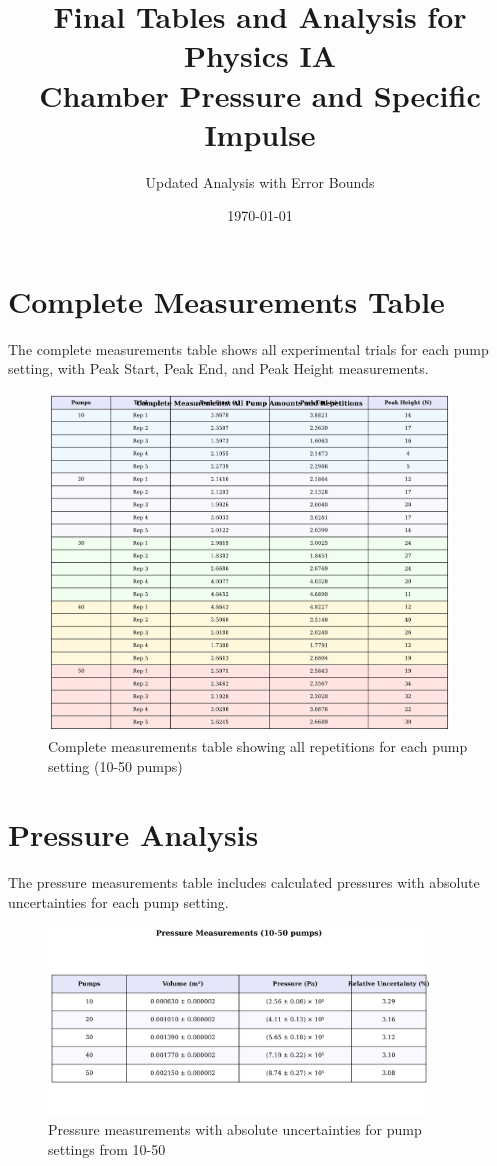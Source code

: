\documentclass[12pt,a4paper]{article}
\title{\textbf{Final Tables and Analysis for Physics IA\\Chamber Pressure and Specific Impulse}}
\author{Updated Analysis with Error Bounds}
\date{\today}
\begin{document}
\maketitle

\section{Complete Measurements Table}

The complete measurements table shows all experimental trials for each pump setting, with Peak Start, Peak End, and Peak Height measurements.

\begin{figure}[H]
\centering
\includegraphics[width=0.95\textwidth]{complete_measurements_table.png}
\caption{Complete measurements table showing all repetitions for each pump setting (10-50 pumps)}
\label{fig:complete_measurements}
\end{figure}

\section{Pressure Analysis}

The pressure measurements table includes calculated pressures with absolute uncertainties for each pump setting.

\begin{figure}[H]
\centering
\includegraphics[width=0.9\textwidth]{pressure_table_updated.png}
\caption{Pressure measurements with absolute uncertainties for pump settings from 10-50}
\label{fig:pressure_table}
\end{figure}
\end{document}
